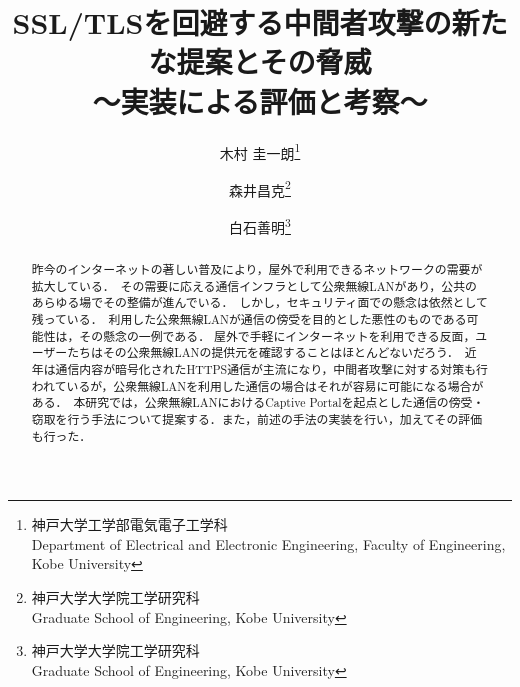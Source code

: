 \documentclass[dvipdfmx,twocolumn]{jsarticle}
\begin{document}
    \title{SSL/TLSを回避する中間者攻撃の新たな提案とその脅威\\～実装による評価と考察～}
    \author{木村 圭一朗\thanks{神戸大学工学部電気電子工学科\\Department of Electrical and Electronic Engineering, Faculty of Engineering, Kobe University} \and 森井昌克\thanks{神戸大学大学院工学研究科\\Graduate School of Engineering, Kobe University} \and 白石善明\thanks{神戸大学大学院工学研究科\\Graduate School of Engineering, Kobe University}}
    \date{}
    \begin{abstract}
        昨今のインターネットの著しい普及により，屋外で利用できるネットワークの需要が拡大している．\
        その需要に応える通信インフラとして公衆無線LANがあり，公共のあらゆる場でその整備が進んでいる．\
        しかし，セキュリティ面での懸念は依然として残っている．\
        利用した公衆無線LANが通信の傍受を目的とした悪性のものである可能性は，その懸念の一例である．
        屋外で手軽にインターネットを利用できる反面，ユーザーたちはその公衆無線LANの提供元を確認することはほとんどないだろう．\
        近年は通信内容が暗号化されたHTTPS通信が主流になり，中間者攻撃に対する対策も行われているが，公衆無線LANを利用した通信の場合はそれが容易に可能になる場合がある．\
        本研究では，公衆無線LANにおけるCaptive Portalを起点とした通信の傍受・窃取を行う手法について提案する．また，前述の手法の実装を行い，加えてその評価も行った．\\
    \end{abstract}
    \maketitle
\end{document}
